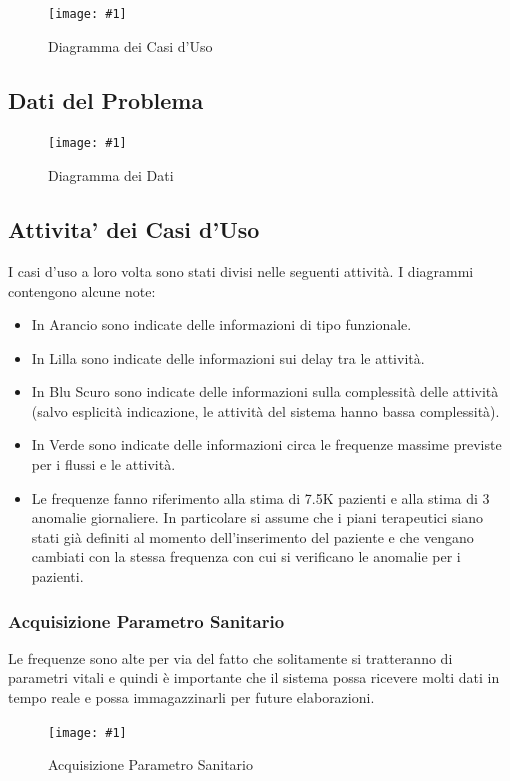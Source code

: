 \documentclass[a4paper,11pt,oneside, table]{article}
\newcommand{\putimage}[4] {
	\begin{figure}[H]
	    \centering
	    \texttt{[image: \#1]}
	    \caption{#2}\label{#3}
	\end{figure}
}
\begin{document}
\putimage{images/Diagramma dei Casi d'Uso.png}{Diagramma dei Casi d'Uso}{png:diagramma-dei-casi-duso}{1}

\subsection{Dati del Problema}

\putimage{images/Diagramma dei Dati.png}{Diagramma dei Dati}{png:diagramma-dei-dati}{1}

\subsection{Attivita' dei Casi d'Uso}

I casi d'uso a loro volta sono stati divisi nelle seguenti attivit\`a. I diagrammi contengono alcune note:

\begin{itemize}
  \item In Arancio sono indicate delle informazioni di tipo funzionale.
  \item In Lilla sono indicate delle informazioni sui delay tra le attivit\`a.
  \item In Blu Scuro sono indicate delle informazioni sulla complessit\`a delle attivit\`a (salvo esplicit\`a indicazione, le attivit\`a del sistema hanno bassa complessit\`a).
  \item In Verde sono indicate delle informazioni circa le frequenze massime previste per i flussi e le attivit\`a.
  \item Le frequenze fanno riferimento alla stima di 7.5K pazienti e alla stima di 3 anomalie giornaliere. In particolare si assume che i piani terapeutici siano stati gi\`a definiti al momento dell'inserimento del paziente e che vengano cambiati con la stessa frequenza con cui si verificano le anomalie per i pazienti.
\end{itemize}

\subsubsection{Acquisizione Parametro Sanitario}

Le frequenze sono alte per via del fatto che solitamente si tratteranno di parametri vitali e quindi \`e importante che il sistema possa ricevere molti dati in tempo reale e possa immagazzinarli per future elaborazioni.

\putimage{images/Diagramma delle Attivita'/Acquisizione Parametro Sanitario.png}{Acquisizione Parametro Sanitario}{png:act:acquisizione-parametro-sanitario}{1}
\end{document}
